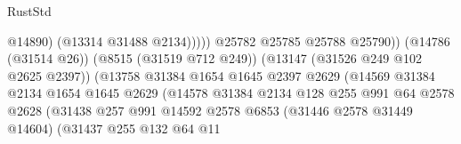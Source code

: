 \begin{lexlean}{RustStd}
\begin{coremodule}
                                                              @14890)
                                                            (@13314 @31488 @2134)))))
                                                    @25782
                                                    @25785
                                                    @25788
                                                    @25790))
                                                (@14786 (@31514 @26))
                                                (@8515 (@31519 @712 @249))
                                                (@13147 (@31526 @249 @102 @2625 @2397))
                                                (@13758
                                                  @31384
                                                  @1654
                                                  @1645
                                                  @2397
                                                  @2629
                                                  (@14569
                                                    @31384
                                                    @2134
                                                    @1654
                                                    @1645
                                                    @2629
                                                    (@14578
                                                      @31384
                                                      @2134
                                                      @128
                                                      @255
                                                      @991
                                                      @64
                                                      @2578
                                                      @2628
                                                      (@31438
                                                        @257
                                                        @991
                                                        @14592
                                                        @2578
                                                        @6853
                                                        (@31446 @2578 @31449 @14604)
                                                        (@31437
                                                          @255
                                                          @132
                                                          @64
                                                          @11

\end{coremodule}
\end{lexlean}
